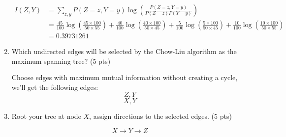\documentclass[a4paper]{article}
\theoremstyle{definition}
\newenvironment{soln}{
	\leavevmode\color{blue}\ignorespaces
}{}
\begin{document}
\begin{enumerate}
\begin{soln}
		      \begin{align*}
			      I(Z, Y) & = \sum_{z, y} P(Z=z, Y=y) \log\left(\frac{P(Z=z, Y=y)}{P(Z=z)P(Y=y)}\right)                                                                                                                                                                                                    \\
			              & = \frac{45}{100} \log\left(\frac{45 \times 100}{50 \times 55}\right) +\frac{40}{100} \log\left(\frac{40 \times 100}{50 \times 45}\right) +\frac{5}{100} \log\left(\frac{5 \times 100}{50 \times 45}\right) +\frac{10}{100} \log\left(\frac{10 \times 100}{50 \times 55}\right) \\
			              & = 0.39731261
		      \end{align*}
	      \end{soln}
	\item Which undirected edges will be selected by the Chow-Liu algorithm as the maximum spanning tree? (5 pts)
	      \begin{soln}
					Choose edges with maximum mutual information without creating a cycle, we'll get the following edges:
		      \[Z, Y\]
		      \[X, Y\]
	      \end{soln}
	\item Root your tree at node $X$, assign directions to the selected edges. (5 pts)
	      \begin{soln}
		      \[X \to Y \to Z\]
	      \end{soln}
\end{enumerate}



\end{document}
